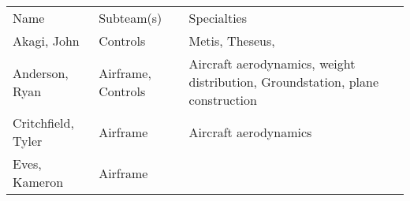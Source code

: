 \begin{longtable}[]{@{}lll@{}}
\toprule
\begin{minipage}[t]{0.30\columnwidth}\raggedright\strut
{Name}\strut
\end{minipage} & \begin{minipage}[t]{0.30\columnwidth}\raggedright\strut
{Subteam(s)}\strut
\end{minipage} & \begin{minipage}[t]{0.30\columnwidth}\raggedright\strut
{Specialties}\strut
\end{minipage}\tabularnewline
\begin{minipage}[t]{0.30\columnwidth}\raggedright\strut
{Akagi, John}\strut
\end{minipage} & \begin{minipage}[t]{0.30\columnwidth}\raggedright\strut
{Controls}\strut
\end{minipage} & \begin{minipage}[t]{0.30\columnwidth}\raggedright\strut
{Metis, Theseus,}\strut
\end{minipage}\tabularnewline
\begin{minipage}[t]{0.30\columnwidth}\raggedright\strut
{Anderson, Ryan}\strut
\end{minipage} & \begin{minipage}[t]{0.30\columnwidth}\raggedright\strut
{Airframe, Controls}\strut
\end{minipage} & \begin{minipage}[t]{0.30\columnwidth}\raggedright\strut
{Aircraft aerodynamics, weight distribution, Groundstation, plane
construction}\strut
\end{minipage}\tabularnewline
\begin{minipage}[t]{0.30\columnwidth}\raggedright\strut
{Critchfield, Tyler}\strut
\end{minipage} & \begin{minipage}[t]{0.30\columnwidth}\raggedright\strut
{Airframe}\strut
\end{minipage} & \begin{minipage}[t]{0.30\columnwidth}\raggedright\strut
{Aircraft aerodynamics}\strut
\end{minipage}\tabularnewline
\begin{minipage}[t]{0.30\columnwidth}\raggedright\strut
{Eves, Kameron}\strut
\end{minipage} & \begin{minipage}[t]{0.30\columnwidth}\raggedright\strut
{Airframe}\strut
\end{minipage} & \begin{minipage}[t]{0.30\columnwidth}\raggedright\strut

\end{minipage}
\end{longtable}
